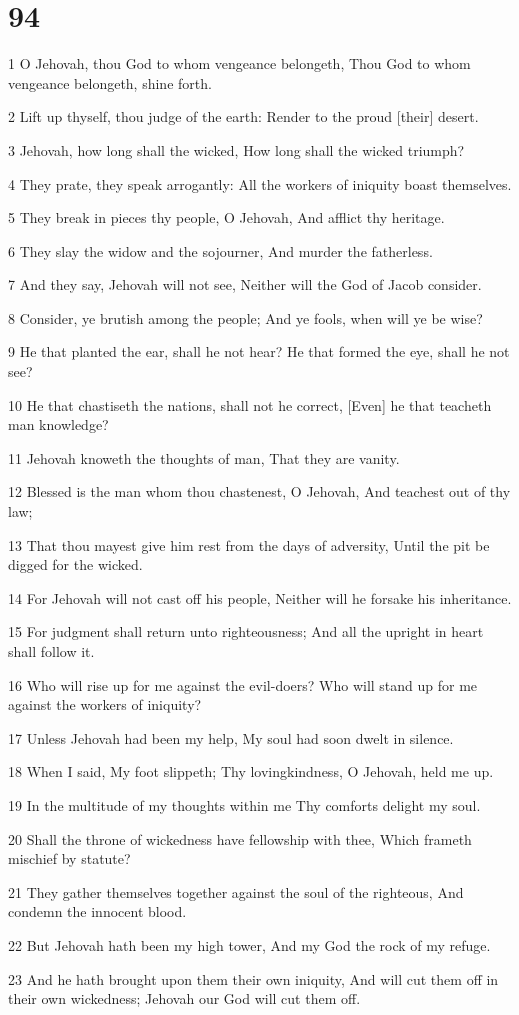 \chapter{94}

\par 1 O Jehovah, thou God to whom vengeance belongeth, Thou God to whom vengeance belongeth, shine forth.
\par 2 Lift up thyself, thou judge of the earth: Render to the proud [their] desert.
\par 3 Jehovah, how long shall the wicked, How long shall the wicked triumph?
\par 4 They prate, they speak arrogantly: All the workers of iniquity boast themselves.
\par 5 They break in pieces thy people, O Jehovah, And afflict thy heritage.
\par 6 They slay the widow and the sojourner, And murder the fatherless.
\par 7 And they say, Jehovah will not see, Neither will the God of Jacob consider.
\par 8 Consider, ye brutish among the people; And ye fools, when will ye be wise?
\par 9 He that planted the ear, shall he not hear? He that formed the eye, shall he not see?
\par 10 He that chastiseth the nations, shall not he correct, [Even] he that teacheth man knowledge?
\par 11 Jehovah knoweth the thoughts of man, That they are vanity.
\par 12 Blessed is the man whom thou chastenest, O Jehovah, And teachest out of thy law;
\par 13 That thou mayest give him rest from the days of adversity, Until the pit be digged for the wicked.
\par 14 For Jehovah will not cast off his people, Neither will he forsake his inheritance.
\par 15 For judgment shall return unto righteousness; And all the upright in heart shall follow it.
\par 16 Who will rise up for me against the evil-doers? Who will stand up for me against the workers of iniquity?
\par 17 Unless Jehovah had been my help, My soul had soon dwelt in silence.
\par 18 When I said, My foot slippeth; Thy lovingkindness, O Jehovah, held me up.
\par 19 In the multitude of my thoughts within me Thy comforts delight my soul.
\par 20 Shall the throne of wickedness have fellowship with thee, Which frameth mischief by statute?
\par 21 They gather themselves together against the soul of the righteous, And condemn the innocent blood.
\par 22 But Jehovah hath been my high tower, And my God the rock of my refuge.
\par 23 And he hath brought upon them their own iniquity, And will cut them off in their own wickedness; Jehovah our God will cut them off.

